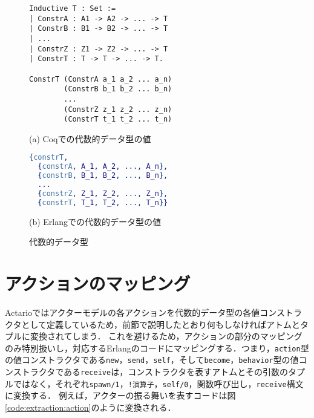 \begin{figure}\centering
\begin{minipage}{1\textwidth}\centering
\begin{lstlisting}[frame=single,numbers=none,xleftmargin=0pt]
Inductive T : Set :=
| ConstrA : A1 -> A2 -> ... -> T
| ConstrB : B1 -> B2 -> ... -> T
| ...
| ConstrZ : Z1 -> Z2 -> ... -> T
| ConstrT : T -> T -> ... -> T.

ConstrT (ConstrA a_1 a_2 ... a_n)
        (ConstrB b_1 b_2 ... b_n)
        ...
        (ConstrZ z_1 z_2 ... z_n)
        (ConstrT t_1 t_2 ... t_n)
\end{lstlisting}
(a) Coqでの代数的データ型の値
\end{minipage}
\begin{minipage}{1\textwidth}\centering
\begin{lstlisting}[frame=single,numbers=none,xleftmargin=0pt,language=Erlang]
{constrT,
  {constrA, A_1, A_2, ..., A_n},
  {constrB, B_1, B_2, ..., B_n},
  ...
  {constrZ, Z_1, Z_2, ..., Z_n},
  {constrT, T_1, T_2, ..., T_n}}
\end{lstlisting}
(b) Erlangでの代数的データ型の値
\end{minipage}
\caption{代数的データ型}\label{code:extraction:adt}
\end{figure}

\section{アクションのマッピング}

Actarioではアクターモデルの各アクションを代数的データ型の各値コンストラクタとして定義しているため，前節で説明したとおり何もしなければアトムとタプルに変換されてしまう．
これを避けるため，アクションの部分のマッピングのみ特別扱いし，対応するErlangのコードにマッピングする．つまり，\lstinline{action}型の値コンストラクタである\lstinline{new}，\lstinline{send}，\lstinline{self}，そして\lstinline{become}，\lstinline{behavior}型の値コンストラクタである\lstinline{receive}は，コンストラクタを表すアトムとその引数のタプルではなく，それぞれ\lstinline{spawn/1}，\lstinline{!演算子}，\lstinline{self/0}，関数呼び出し，\lstinline{receive}構文に変換する．
例えば，アクターの振る舞いを表すコードは図\ref{code:extraction:action}のように変換される．

